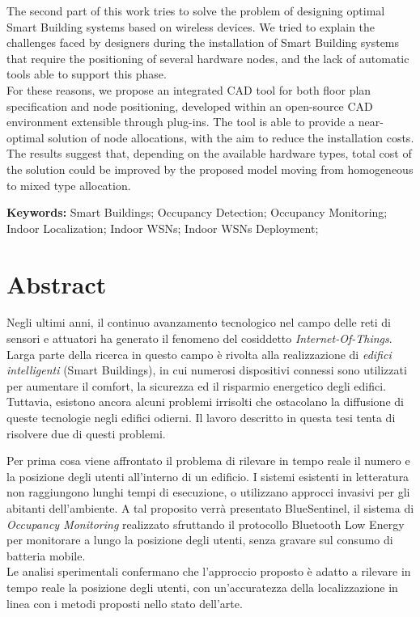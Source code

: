 The second part of this work tries to solve the problem of designing optimal Smart Building systems based on wireless devices. We tried to explain the challenges faced by designers during the installation of Smart Building systems that require the positioning of several hardware nodes, and the lack of automatic tools able to support this phase.\\
For these reasons, we propose an integrated CAD tool for both floor plan specification and node positioning, developed within an \mbox{open-source} CAD environment extensible through plug-ins. The tool is able to provide a near-optimal solution of node allocations, with the aim to reduce the installation costs. The results suggest that, depending on the available hardware types, total cost of the solution could be improved by the proposed model moving from homogeneous to mixed type allocation.

\medskip
%
\noindent \textbf{Keywords:} 
Smart Buildings; Occupancy Detection; Occupancy Monitoring; Indoor Localization; Indoor WSNs; Indoor WSNs Deployment;
%
\clearpage
%
%
%
\cleardoublepage
%
%
\chapter*{Abstract}
%
Negli ultimi anni, il continuo avanzamento tecnologico nel campo delle reti di sensori e attuatori ha generato il fenomeno del cosiddetto \emph{Internet-Of-Things}. Larga parte della ricerca in questo campo è rivolta alla realizzazione di \emph{edifici intelligenti} (Smart Buildings), in cui numerosi dispositivi connessi sono utilizzati per aumentare il comfort, la sicurezza ed il risparmio energetico degli edifici. Tuttavia, esistono ancora alcuni problemi irrisolti che ostacolano la diffusione di queste tecnologie negli edifici odierni. Il lavoro descritto in questa tesi tenta di risolvere due di questi problemi.

Per prima cosa viene affrontato il problema di rilevare in tempo reale il numero e la posizione degli utenti all'interno di un edificio. I sistemi esistenti in letteratura non raggiungono lunghi tempi di esecuzione, o utilizzano approcci invasivi per gli abitanti dell'ambiente.
A tal proposito verrà presentato BlueSentinel, il sistema di \emph{Occupancy Monitoring} realizzato sfruttando il protocollo Bluetooth Low Energy per monitorare a lungo la posizione degli utenti, senza gravare sul consumo di batteria mobile.\\
Le analisi sperimentali confermano che l'approccio proposto è adatto a rilevare in tempo reale la posizione degli utenti, con un'accuratezza della localizzazione in linea con i metodi proposti nello stato dell'arte.

